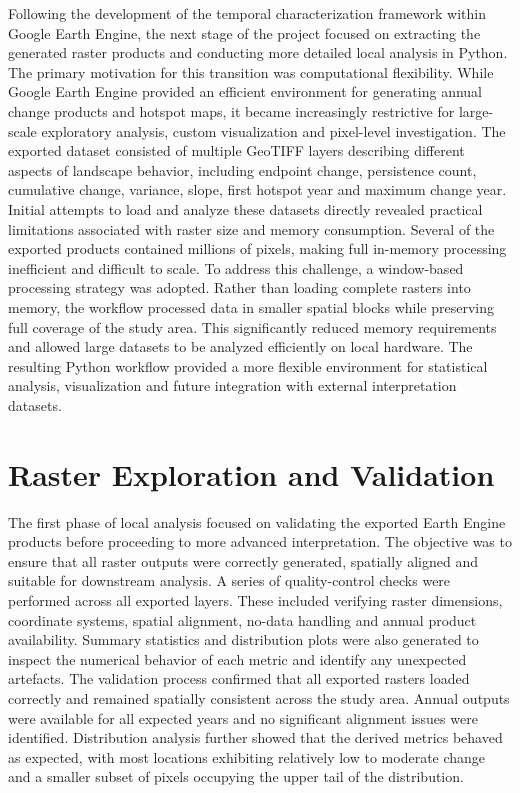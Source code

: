 \documentclass[11pt,a4paper]{article}
\begin{document}
Following the development of the temporal characterization framework within Google Earth Engine, the next stage of the project focused on extracting the generated raster products and conducting more detailed local analysis in Python. The primary motivation for this transition was computational flexibility. While Google Earth Engine provided an efficient environment for generating annual change products and hotspot maps, it became increasingly restrictive for large-scale exploratory analysis, custom visualization and pixel-level investigation. The exported dataset consisted of multiple GeoTIFF layers describing different aspects of landscape behavior, including endpoint change, persistence count, cumulative change, variance, slope, first hotspot year and maximum change year. Initial attempts to load and analyze these datasets directly revealed practical limitations associated with raster size and memory consumption. Several of the exported products contained millions of pixels, making full in-memory processing inefficient and difficult to scale. To address this challenge, a window-based processing strategy was adopted. Rather than loading complete rasters into memory, the workflow processed data in smaller spatial blocks while preserving full coverage of the study area. This significantly reduced memory requirements and allowed large datasets to be analyzed efficiently on local hardware. The resulting Python workflow provided a more flexible environment for statistical analysis, visualization and future integration with external interpretation datasets.

\section{Raster Exploration and Validation}

The first phase of local analysis focused on validating the exported Earth Engine products before proceeding to more advanced interpretation. The objective was to ensure that all raster outputs were correctly generated, spatially aligned and suitable for downstream analysis. A series of quality-control checks were performed across all exported layers. These included verifying raster dimensions, coordinate systems, spatial alignment, no-data handling and annual product availability. Summary statistics and distribution plots were also generated to inspect the numerical behavior of each metric and identify any unexpected artefacts. The validation process confirmed that all exported rasters loaded correctly and remained spatially consistent across the study area. Annual outputs were available for all expected years and no significant alignment issues were identified. Distribution analysis further showed that the derived metrics behaved as expected, with most locations exhibiting relatively low to moderate change and a smaller subset of pixels occupying the upper tail of the distribution.
\end{document}
